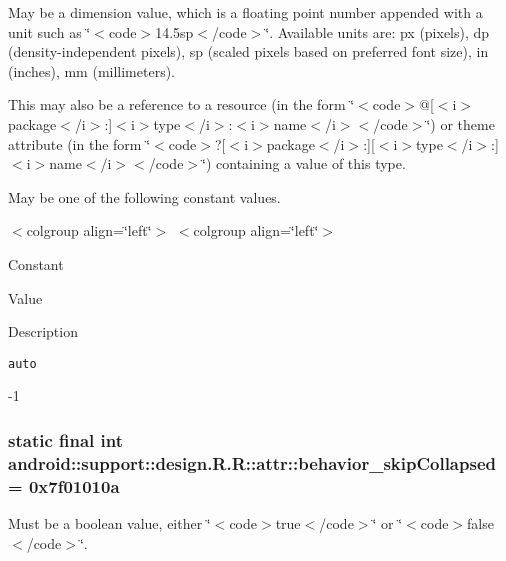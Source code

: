 May be a dimension value, which is a floating point number appended with a unit such as \char`\"{}$<$code$>$14.5sp$<$/code$>$\char`\"{}. Available units are: px (pixels), dp (density-independent pixels), sp (scaled pixels based on preferred font size), in (inches), mm (millimeters). 

This may also be a reference to a resource (in the form \char`\"{}$<$code$>$@\mbox{[}$<$i$>$package$<$/i$>$:\mbox{]}$<$i$>$type$<$/i$>$:$<$i$>$name$<$/i$>$$<$/code$>$\char`\"{}) or theme attribute (in the form \char`\"{}$<$code$>$?\mbox{[}$<$i$>$package$<$/i$>$:\mbox{]}\mbox{[}$<$i$>$type$<$/i$>$:\mbox{]}$<$i$>$name$<$/i$>$$<$/code$>$\char`\"{}) containing a value of this type. 

May be one of the following constant values. \begin{TabularC}{0}
\hline
\end{TabularC}
$<$colgroup align=\char`\"{}left\char`\"{}$>$ $<$colgroup align=\char`\"{}left\char`\"{}$>$ 

Constant

Value

Description 

{\tt auto}

-1\hypertarget{classandroid_1_1support_1_1design_1_1_r_1_1attr_a80b34d92020b7e22fd442a53b515890}{
\subsubsection[{behavior\_\-skipCollapsed}]{\setlength{\rightskip}{0pt plus 5cm}static final int android::support::design.R.R::attr::behavior\_\-skipCollapsed = 0x7f01010a}}
\label{classandroid_1_1support_1_1design_1_1_r_1_1attr_a80b34d92020b7e22fd442a53b515890}


Must be a boolean value, either \char`\"{}$<$code$>$true$<$/code$>$\char`\"{} or \char`\"{}$<$code$>$false$<$/code$>$\char`\"{}. 

